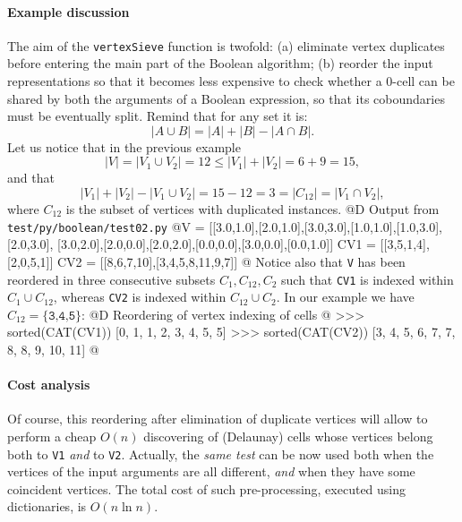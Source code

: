 \documentclass[11pt,oneside]{article}	%
\begin{document}
\paragraph{Example discussion} 
The aim of the \texttt{vertexSieve} function is twofold: (a) eliminate vertex duplicates before entering the main part of the Boolean algorithm; (b) reorder the input representations so that it becomes less expensive to check whether a 0-cell can be shared by both the arguments of a Boolean expression, so that its coboundaries must be eventually split. Remind that for any set it is:
\[
|A\cup B| = |A|+|B|-|A\cap B|.
\]
Let us notice that in the previous example
\[
|V| = |V_1 \cup V_2| = 12 \leq |V_1|+|V_2| = 6+9 = 15,
\]
and that 
\[
|V_1|+|V_2| - |V_1 \cup V_2| = 15 - 12 = 3 = |C_{12}| = |V_1 \cap V_2|,
\]
where $C_{12}$ is the subset of vertices with duplicated instances.
@D Output from \texttt{test/py/boolean/test02.py}
@{V   = [[3.0,1.0],[2.0,1.0],[3.0,3.0],[1.0,1.0],[1.0,3.0],[2.0,3.0],
		 [3.0,2.0],[2.0,0.0],[2.0,2.0],[0.0,0.0],[3.0,0.0],[0.0,1.0]]
CV1 = [[3,5,1,4],[2,0,5,1]]
CV2 = [[8,6,7,10],[3,4,5,8,11,9,7]]
@}
Notice also that \texttt{V} has been reordered in three consecutive subsets $C_{1},C_{12},C_{2}$ such that \texttt{CV1} is indexed within $C_{1}\cup C_{12}$, whereas \texttt{CV2} is indexed within $C_{12}\cup C_{2}$. In our example we have  $C_{12}=\{\texttt{3,4,5}\}$: 
@D Reordering of vertex indexing of cells
@{
>>> sorted(CAT(CV1))
[0, 1, 1, 2, 3, 4, 5, 5]
>>> sorted(CAT(CV2))
[3, 4, 5, 6, 7, 7, 8, 8, 9, 10, 11]
@}
\paragraph{Cost analysis} 
Of course, this reordering after elimination of duplicate vertices will allow to perform a cheap $O(n)$ discovering of (Delaunay) cells whose vertices belong both to \texttt{V1} \emph{and} to \texttt{V2}. 
Actually, the \emph{same test} can be now used both when the vertices of the input arguments are all different, \emph{and} when they have some coincident vertices.
The total cost of such pre-processing, executed using dictionaries, is $O(n\ln n)$.

\end{document}
